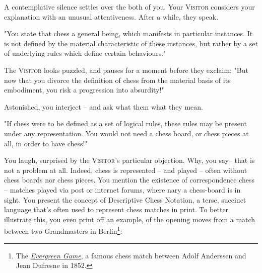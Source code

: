 A contemplative silence settles over the both of you. Your \textsc{Visitor} considers your explanation with an unusual attentiveness. After a while, they speak.

"You state that chess a general being, which manifests in particular instances. It is not defined by the material characteristic of these instances, but rather by a set of underlying rules which define certain behaviours."

The \textsc{Visitor} looks puzzled, and pauses for a moment before they exclaim: "But now that you divorce the definition of chess from the material basis of its embodiment, you risk a progression into absurdity!"

Astonished, you interject -- and ask what them what they mean.

"If chess were to be defined as a set of logical rules, these rules may be present under any representation. You would not need a chess board, or chess pieces at all, in order to have chess!"

You laugh, surprised by the \textsc{Visitor}'s particular objection. Why, you say-- that is not a problem at all. Indeed, chess is represented -- and played -- often without chess boards nor chess pieces. You mention the existence of correspondence chess -- matches played via post or internet forums, where nary a chess-board is in sight. You present the concept of Descriptive Chess Notation, a terse, succinct language that's often used to represent chess matches in print. To better illustrate this, you even print off an example, of the opening moves from a match between two Grandmasters in Berlin\footnote{The \href{https://en.wikipedia.org/wiki/Evergreen_Game}{\emph{Evergreen Game}}, a famous chess match between Adolf Anderssen and Jean Dufresne in 1852.}:

\begin{center}
\end{center}


